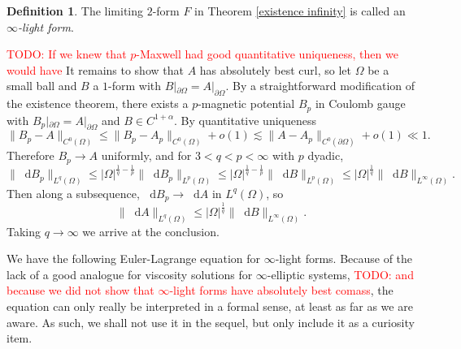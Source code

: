 \documentclass[reqno,11pt]{amsart}
\newcommand*\dif{\mathop{}\!\mathrm{d}}
\newcommand{\dfn}[1]{\emph{#1}\index{#1}}
\theoremstyle{definition}
\newtheorem{definition}[theorem]{Definition}
\numberwithin{equation}{section}
\newcommand\todo[1]{\textcolor{red}{TODO: #1}}
\begin{document}
\begin{definition}
The limiting $2$-form $F$ in Theorem \ref{existence infinity} is called an \dfn{$\infty$-light form}.
\end{definition}

\todo{If we knew that $p$-Maxwell had good quantitative uniqueness, then we would have}
It remains to show that $A$ has absolutely best curl, so let $\Omega$ be a small ball and $B$ a $1$-form with $B|_{\partial \Omega} = A|_{\partial \Omega}$.
By a straightforward modification of the existence theorem, there exists a $p$-magnetic potential $B_p$ in Coulomb gauge with $B_p|_{\partial \Omega} = A|_{\partial \Omega}$ and $B \in C^{1 + \alpha}$.
By quantitative uniqueness
$$\|B_p - A\|_{C^0(\Omega)} \leq \|B_p - A_p\|_{C^0(\Omega)} + o(1) \lesssim \|A - A_p\|_{C^0(\partial \Omega)} + o(1) \ll 1.$$
Therefore $B_p \to A$ uniformly, and for $3 < q < p < \infty$ with $p$ dyadic,
$$\|\dif B_p\|_{L^q(\Omega)} \leq |\Omega|^{\frac{1}{q} -\frac{1}{p}} \|\dif B_p\|_{L^p(\Omega)} \leq |\Omega|^{\frac{1}{q} -\frac{1}{p}} \|\dif B\|_{L^p(\Omega)} \leq |\Omega|^{\frac{1}{q}} \|\dif B\|_{L^\infty(\Omega)}.$$
Then along a subsequence, $\dif B_p \to \dif A$ in $L^q(\Omega)$, so 
$$\|\dif A\|_{L^q(\Omega)} \leq |\Omega|^{\frac{1}{q}} \|\dif B\|_{L^\infty(\Omega)}.$$
Taking $q \to \infty$ we arrive at the conclusion.

We have the following Euler-Lagrange equation for $\infty$-light forms.
Because of the lack of a good analogue for viscosity solutions for $\infty$-elliptic systems, \todo{and because we did not show that $\infty$-light forms have absolutely best comass}, the equation can only really be interpreted in a formal sense, at least as far as we are aware.
As such, we shall not use it in the sequel, but only include it as a curiosity item.
\end{document}
